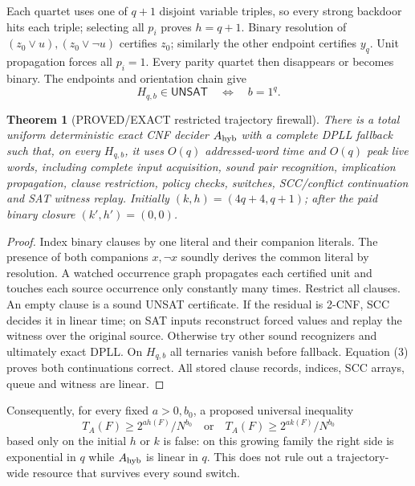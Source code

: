 \documentclass[11pt]{article}
\newtheorem{theorem}{Theorem}
\newcommand{\UNSAT}{\mathsf{UNSAT}}
\begin{document}
Each quartet uses one of $q+1$ disjoint variable triples, so every strong
backdoor hits each triple; selecting all $p_i$ proves $h=q+1$.  Binary
resolution of $(z_0\vee u),(z_0\vee\neg u)$ certifies $z_0$; similarly the
other endpoint certifies $y_q$.  Unit propagation forces all $p_i=1$.
Every parity quartet then disappears or becomes binary.  The endpoints and
orientation chain give
\[
H_{q,b}\in\UNSAT\quad\Longleftrightarrow\quad b=1^q.
\tag{3}
\]

\begin{theorem}[PROVED/EXACT restricted trajectory firewall]
There is a total uniform deterministic exact CNF decider $A_{\rm hyb}$ with
a complete DPLL fallback such that, on every $H_{q,b}$, it uses $O(q)$
addressed-word time and $O(q)$ peak live words, including complete input
acquisition, sound pair recognition, implication propagation, clause
restriction, policy checks, switches, SCC/conflict continuation and SAT
witness replay.  Initially $(k,h)=(4q+4,q+1)$; after the paid binary closure
$(k',h')=(0,0)$.
\end{theorem}
\begin{proof}
Index binary clauses by one literal and their companion literals.  The
presence of both companions $x,\neg x$ soundly derives the common literal by
resolution.  A watched occurrence graph propagates each certified unit and
touches each source occurrence only constantly many times.  Restrict all
clauses.  An empty clause is a sound UNSAT certificate.  If the residual is
2-CNF, SCC decides it in linear time; on SAT inputs reconstruct forced values
and replay the witness over the original source.  Otherwise try other sound
recognizers and ultimately exact DPLL.  On $H_{q,b}$ all ternaries vanish
before fallback.  Equation (3) proves both continuations correct.  All
stored clause records, indices, SCC arrays, queue and witness are linear.
\end{proof}

Consequently, for every fixed $a>0,b_0$, a proposed universal inequality
\[
T_A(F)\ge 2^{a h(F)}/N^{b_0}
\quad\text{or}\quad
T_A(F)\ge 2^{a k(F)}/N^{b_0}
\tag{4}
\]
based only on the initial $h$ or $k$ is false: on this growing family the
right side is exponential in $q$ while $A_{\rm hyb}$ is linear in $q$.
This does not rule out a trajectory-wide resource that survives every sound
switch.
\end{document}
